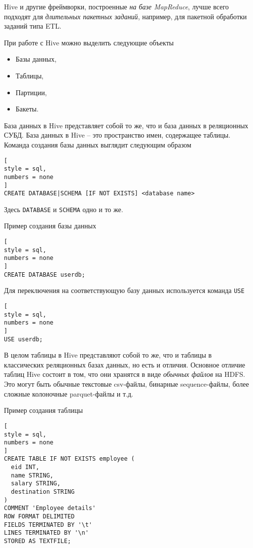 \documentclass[%
	11pt,
	a4paper,
	utf8,
		]{article}
\begin{document}
Hive и другие фреймворки, построенные \emph{на базе MapReduce}, лучше всего подходят для \emph{длительных пакетных заданий}, например, для пакетной обработки заданий типа ETL.

При работе с Hive можно выделить следующие объекты
\begin{itemize}
	\item Базы данных,
	
	\item Таблицы,
	
	\item Партиции,
	
	\item Бакеты.
\end{itemize}

База данных в Hive представляет собой то же, что и база данных в реляционных СУБД. База данных в Hive -- это пространство имен, содержащее таблицы. Команда создания базы данных выглядит следующим образом
\begin{lstlisting}[
style = sql,
numbers = none	
]
CREATE DATABASE|SCHEMA [IF NOT EXISTS] <database name>
\end{lstlisting}

Здесь \texttt{DATABASE} и \texttt{SCHEMA} одно и то же.

Пример создания базы данных
\begin{lstlisting}[
style = sql,
numbers = none	
]
CREATE DATABASE userdb;
\end{lstlisting}

Для переключения на соответствующую базу данных используется команда \texttt{USE}
\begin{lstlisting}[
style = sql,
numbers = none	
]
USE userdb;
\end{lstlisting}

В целом таблицы в Hive представляют собой то же, что и таблицы в классических реляционных базах данных, но есть и отличия. Основное отличие таблиц Hive состоит в том, что они хранятся в виде \emph{обычных файлов} на HDFS. Это могут быть обычные текстовые csv-файлы, бинарные sequence-файлы, более сложные колоночные parquet-файлы и т.д.

Пример создания таблицы
\begin{lstlisting}[
style = sql,
numbers = none	
]
CREATE TABLE IF NOT EXISTS employee (
  eid INT,
  name STRING,
  salary STRING,
  destination STRING
)
COMMENT 'Employee details'
ROW FORMAT DELIMITED
FIELDS TERMINATED BY '\t'
LINES TERMINATED BY '\n'
STORED AS TEXTFILE;
\end{lstlisting}
\end{document}
